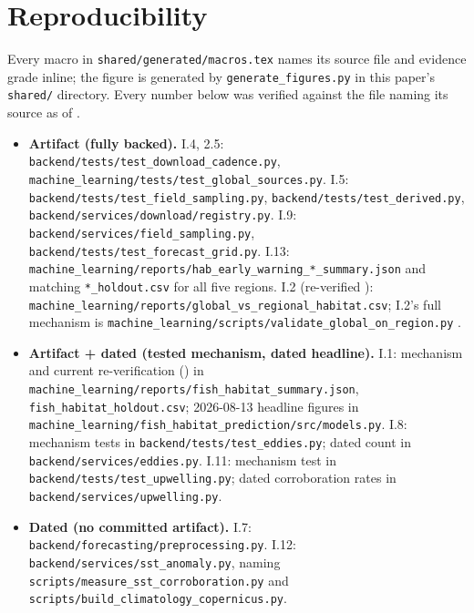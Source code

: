 \documentclass[runningheads]{llncs}
\providecommand{\citep}[1]{\cite{#1}}
\begin{document}
\section*{Reproducibility}
Every macro in \texttt{shared/generated/macros.tex} names its source file and
evidence grade inline; the figure is generated by
\texttt{generate\_figures.py} in this paper's \texttt{shared/} directory.
Every number below was verified against the file naming its source as of
\AsOf{}.
{\raggedright\sloppy
\begin{itemize}\itemsep1pt\parskip0pt
\item[] \textbf{Artifact (fully backed).} I.4, 2.5:
\texttt{backend/tests/\allowbreak{}test\_download\_cadence.py},
\texttt{machine\_learning/tests/\allowbreak{}test\_global\_sources.py}. I.5:
\texttt{backend/tests/\allowbreak{}test\_field\_sampling.py},
\texttt{backend/tests/\allowbreak{}test\_derived.py},
\texttt{backend/services/\allowbreak{}download/registry.py}. I.9:
\texttt{backend/services/\allowbreak{}field\_sampling.py},
\texttt{backend/tests/\allowbreak{}test\_forecast\_grid.py}. I.13:
\texttt{machine\_learning/reports/\allowbreak{}hab\_early\_warning\_*\_summary.json}
and matching \texttt{*\_holdout.csv} for all five regions. I.2
(re-verified \AsOf{}): \texttt{machine\_learning/reports/\allowbreak{}global\_vs\_regional\_habitat.csv};
I.2's full mechanism is \texttt{machine\_learning/scripts/\allowbreak{}validate\_global\_on\_region.py}
\citep{moredata2026}.
\item[] \textbf{Artifact + dated (tested mechanism, dated headline).} I.1:
mechanism and current re-verification (\AsOf{}) in
\texttt{machine\_learning/reports/\allowbreak{}fish\_habitat\_summary.json},
\texttt{fish\_habitat\_holdout.csv}; 2026-08-13 headline figures in
\texttt{machine\_learning/fish\_habitat\_prediction/\allowbreak{}src/models.py}.
I.8: mechanism tests in \texttt{backend/tests/\allowbreak{}test\_eddies.py};
dated count in \texttt{backend/services/\allowbreak{}eddies.py}. I.11:
mechanism test in \texttt{backend/tests/\allowbreak{}test\_upwelling.py};
dated corroboration rates in \texttt{backend/services/\allowbreak{}upwelling.py}.
\item[] \textbf{Dated (no committed artifact).} I.7:
\texttt{backend/forecasting/\allowbreak{}preprocessing.py}. I.12:
\texttt{backend/services/\allowbreak{}sst\_anomaly.py}, naming
\texttt{scripts/measure\_sst\_corroboration.py} and
\texttt{scripts/build\_climatology\_copernicus.py}.
\end{itemize}}



\end{document}
